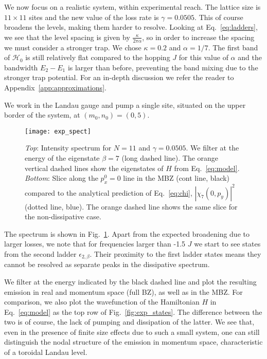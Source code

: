 \documentclass[twocolumn, 10pt, aps, superscriptaddress, floatfix, showpacs, prb, citeautoscript]{revtex4-1}
\newcommand{\co}[2]{#2}
\renewcommand{\paragraph}{\co}
\begin{document}
\paragraph{Greater dissipation implies spectral broadening.}
We now focus on a realistic system, within experimental reach. The
lattice size is $11 \times 11$ sites and the new value of the loss
rate is $\gamma = 0.0505$. This of course broadens the levels, making
them harder to resolve. Looking at Eq.~\eqref{eq:ladders}, we see that
the level spacing is given by $\frac{\kappa}{2\pi\alpha}$, so in order
to increase the spacing we must consider a stronger trap. We chose
$\kappa = 0.2$ and $\alpha = 1/7$. The first band of $\mathcal{H}_0$
is still relatively flat compared to the hopping $J$ for this value of
$\alpha$ and the bandwidth $E_2 - E_1$ is larger than before,
preventing the band mixing due to the stronger trap potential. For an
in-depth discussion we refer the reader to
Appendix~\ref{app:approximations}.

 We work in the Landau gauge and pump a single site,
situated on the upper border of the system, at $(m_0,n_0)= (0,5)$.

\begin{figure}[htb]
  \centering
  \texttt{[image: exp\_spect]}
  \caption{\emph{Top}: Intensity spectrum for $N=11$ and
    $\gamma = 0.0505$. We filter at the energy of the eigenstate
    $\beta=7$ (long dashed line). The orange vertical dashed lines
    show the eigenstates of $H$ from Eq.~\eqref{eq:model}.
    \emph{Bottom}: Slice along the $p_x^0 = 0$ line in the MBZ (cont
    line, black) compared to the analytical prediction of
    Eq.~\eqref{eq:chi}, $|\chi_7(0,p_y)|^2$ (dotted line, blue). The
    orange dashed line shows the same slice for the non-dissipative
    case.}
  \label{fig:exp_spectrum}
\end{figure}


The spectrum is shown in Fig.~\ref{fig:exp_spectrum}. Apart from the
expected broadening due to larger losses, we note that for frequencies
larger than -1.5 $J$ we start to see states from the second ladder
$\epsilon_{2,\beta}$. Their proximity to the first ladder states means
they cannot be resolved as separate peaks in the dissipative spectrum.

We filter at the energy indicated by the black dashed line and plot
the resulting emission in real and momentum space (full BZ), as well
as in the MBZ. For comparison, we also plot the wavefunction of the
Hamiltonian $H$ in Eq.~\eqref{eq:model} as the top row of
Fig.~\ref{fig:exp_states}. The difference between the two is of
course, the lack of pumping and dissipation of the latter. We see
that, even in the presence of finite size effects due to such a small
system, one can still distinguish the nodal structure of the emission
in momentum space, characteristic of a toroidal Landau level. 
\end{document}
